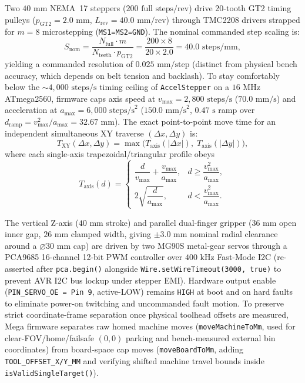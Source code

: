 \documentclass[10pt,twocolumn,letterpaper]{article}
\begin{document}
Two $40\text{ mm}$ NEMA~17 steppers ($200\text{ full steps/rev}$) drive 20-tooth GT2 timing pulleys ($p_{\mathrm{GT2}} = 2.0\text{ mm}$, $L_{\mathrm{rev}} = 40.0\text{ mm/rev}$) through TMC2208 drivers strapped for $m = 8$ microstepping (\texttt{MS1=MS2=GND}). The nominal commanded step scaling is:
\begin{equation}
  S_{\mathrm{nom}} = \frac{N_{\mathrm{full}} \cdot m}{N_{\mathrm{teeth}} \cdot p_{\mathrm{GT2}}} = \frac{200 \times 8}{20 \times 2.0} = 40.0\text{ steps/mm},
  \label{eq:step_scale}
\end{equation}
yielding a commanded resolution of $0.025\text{ mm/step}$ (distinct from physical bench accuracy, which depends on belt tension and backlash). To stay comfortably below the $\sim 4{,}000\text{ steps/s}$ timing ceiling of \texttt{AccelStepper} on a $16\text{ MHz}$ ATmega2560, firmware caps axis speed at $v_{\max} = 2{,}800\text{ steps/s}$ ($70.0\text{ mm/s}$) and acceleration at $a_{\max} = 6{,}000\text{ steps/s}^2$ ($150.0\text{ mm/s}^2$, $0.47\text{ s}$ ramp over $d_{\mathrm{ramp}} = v_{\max}^2 / a_{\max} = 32.67\text{ mm}$). The exact point-to-point move time for an independent simultaneous XY traverse $(\Delta x, \Delta y)$ is:
\begin{equation}
  T_{\mathrm{XY}}(\Delta x, \Delta y) = \max\!\big(T_{\mathrm{axis}}(|\Delta x|),\; T_{\mathrm{axis}}(|\Delta y|)\big),
  \label{eq:xy_move}
\end{equation}
where each single-axis trapezoidal/triangular profile obeys
\begin{equation}
  T_{\mathrm{axis}}(d) =
  \begin{cases}
    \dfrac{d}{v_{\max}} + \dfrac{v_{\max}}{a_{\max}}, & d \ge \dfrac{v_{\max}^2}{a_{\max}}, \\[8pt]
    2\sqrt{\dfrac{d}{a_{\max}}}, & d < \dfrac{v_{\max}^2}{a_{\max}}.
  \end{cases}
  \label{eq:trap_profile}
\end{equation}

The vertical Z-axis ($40\text{ mm}$ stroke) and parallel dual-finger gripper ($36\text{ mm}$ open inner gap, $26\text{ mm}$ clamped width, giving $\pm 3.0\text{ mm}$ nominal radial clearance around a $\varnothing 30\text{ mm}$ cap) are driven by two MG90S metal-gear servos through a PCA9685 16-channel 12-bit PWM controller over $400\text{ kHz}$ Fast-Mode I2C (re-asserted after \texttt{pca.begin()} alongside \texttt{Wire.setWireTimeout(3000, true)} to prevent AVR I2C bus lockup under stepper EMI). Hardware output enable (\texttt{PIN\_SERVO\_OE = Pin~9}, active-LOW) remains \texttt{HIGH} at boot and on hard faults to eliminate power-on twitching and uncommanded fault motion. To preserve strict coordinate-frame separation once physical toolhead offsets are measured, Mega firmware separates raw homed machine moves (\texttt{moveMachineToMm}, used for clear-FOV/home/failsafe $(0,0)$ parking and bench-measured external bin coordinates) from board-space cap moves (\texttt{moveBoardToMm}, adding \texttt{TOOL\_OFFSET\_X/Y\_MM} and verifying shifted machine travel bounds inside \texttt{isValidSingleTarget()}).
\end{document}
